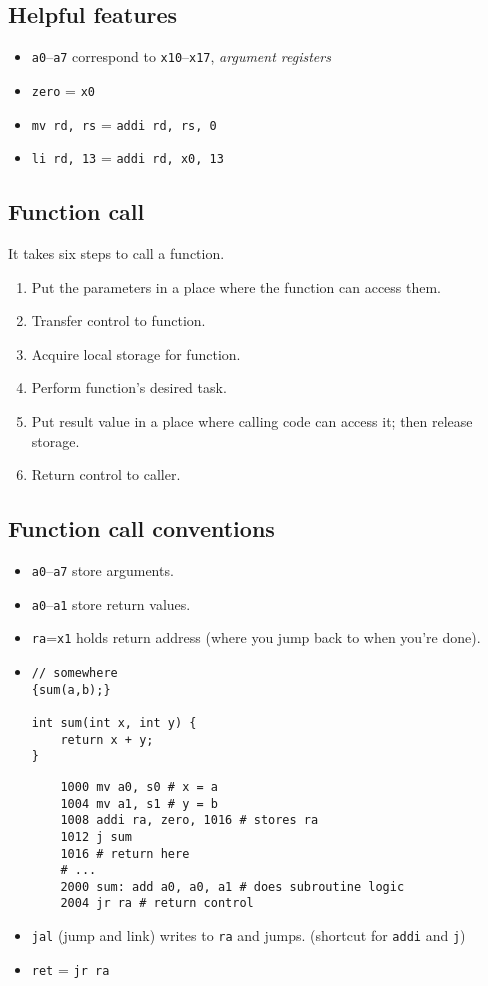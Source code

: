 \subsection{Helpful features}
\begin{itemize}
	\item \texttt{a0}--\texttt{a7} correspond to \texttt{x10}--\texttt{x17}, \emph{argument registers}
	\item \texttt{zero} = \texttt{x0}
	\item \texttt{mv rd, rs} = \texttt{addi rd, rs, 0}
	\item \texttt{li rd, 13} = \texttt{addi rd, x0, 13}
\end{itemize}

\subsection{Function call}
It takes six steps to call a function.
\begin{enumerate}
	\item Put the parameters in a place where the function can access them.
	\item Transfer control to function.
	\item Acquire local storage for function.
	\item Perform function's desired task.
	\item Put result value in a place where calling code can access it; then release storage.
	\item Return control to caller.
\end{enumerate}

\subsection{Function call conventions}
\begin{itemize}
	\item \texttt{a0}--\texttt{a7} store arguments.
	\item \texttt{a0}--\texttt{a1} store return values.
	\item \texttt{ra}=\texttt{x1} holds return address (where you jump back to when you're done).
	\item\begin{verbatim}
// somewhere
{sum(a,b);}

int sum(int x, int y) {
	return x + y;
}
	\end{verbatim}
	
	\begin{verbatim}
	1000 mv a0, s0 # x = a
	1004 mv a1, s1 # y = b
	1008 addi ra, zero, 1016 # stores ra
	1012 j sum
	1016 # return here
	# ...
	2000 sum: add a0, a0, a1 # does subroutine logic
	2004 jr ra # return control
	\end{verbatim}
	\item \texttt{jal} (jump and link) writes to \texttt{ra} and jumps. (shortcut for \texttt{addi} and \texttt{j})
	\item \texttt{ret}  = \texttt{jr ra}
\end{itemize}

